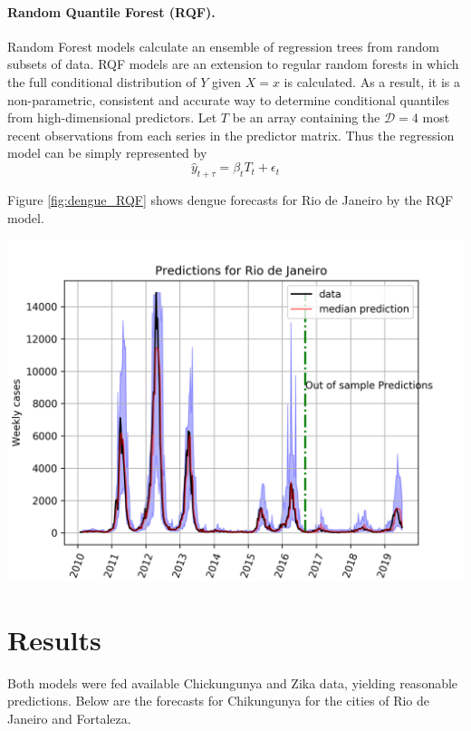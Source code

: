\documentclass[a0,portrait]{a0poster}
\begin{document}
\begin{multicols}{3}
\paragraph*{Random Quantile Forest (RQF).}
Random Forest models calculate an ensemble of regression trees from random 
subsets of data. RQF models are an extension to regular random forests in which 
the full conditional distribution of $Y$ given $X=x$ is calculated. As a 
result, it is a non-parametric, consistent and accurate way to determine 
conditional quantiles from high-dimensional 
predictors\cite{meinshausen2006quantile}. Let $T$ be an array containing the 
${\mathcal D=4}$ most recent observations from each 
series in the predictor matrix. Thus the regression model can be simply 
represented by
\begin{equation}
\hat{y}_{t+\tau} = \beta_{t} T_{t} + \epsilon_t
\label{eq:rf_trans}
\end{equation} 

Figure \ref{fig:dengue_RQF} shows dengue forecasts for Rio de Janeiro by the 
RQF model.

\begin{center}
\includegraphics[width=0.8\linewidth]{figures/qf_Rio_de_Janeiro_dengue.png}
\label{fig:dengue_RQF}
\end{center}%

\section*{Results}
\noindent
Both models were fed available Chickungunya and Zika data, yielding 
reasonable predictions. Below are the forecasts for Chikungunya for the cities 
of Rio de Janeiro and Fortaleza.


\end{multicols}
\end{document}
